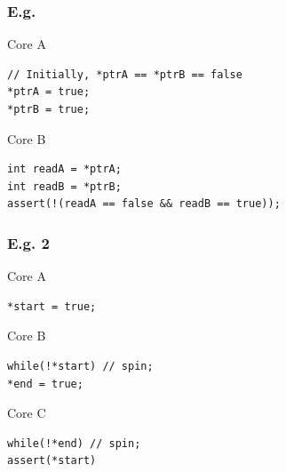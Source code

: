 \documentclass[UTF-8]{ctexbeamer}
\begin{document}
\begin{frame}[fragile]
  \frametitle{E.g.}
  \begin{block}{Core A}
    \begin{verbatim}
// Initially, *ptrA == *ptrB == false
*ptrA = true;
*ptrB = true;
    \end{verbatim}
  \end{block}
  \begin{block}{Core B}
    \begin{verbatim}
int readA = *ptrA;
int readB = *ptrB;
assert(!(readA == false && readB == true));
    \end{verbatim}
  \end{block}

  \pause

\end{frame}

\begin{frame}[fragile]
  \frametitle{E.g. 2}
  \begin{block}{Core A}
    \begin{verbatim}
*start = true;
    \end{verbatim}
  \end{block}
  \begin{block}{Core B}
    \begin{verbatim}
while(!*start) // spin;
*end = true;
    \end{verbatim}
  \end{block}
  \begin{block}{Core C}
    \begin{verbatim}
while(!*end) // spin;
assert(*start)
    \end{verbatim}
  \end{block}
\end{frame}
\end{document}
